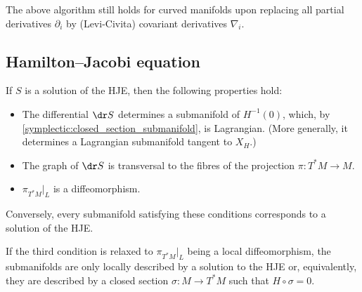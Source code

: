     \begin{remark}
        The above algorithm still holds for curved manifolds upon replacing all partial derivatives $\partial_i$ by (Levi-Civita) covariant derivatives $\nabla_i$.
    \end{remark}


\subsection{Hamilton--Jacobi equation}\label{section:hamilton_jacobi}


    \begin{property}
        If $S$ is a solution of the HJE, then the following properties hold:
        \begin{itemize}
            \item The differential $\dr S$ determines a submanifold of $H^{-1}(0)$, which, by \cref{symplectic:closed_section_submanifold}, is Lagrangian. (More generally, it determines a Lagrangian submanifold tangent to $X_H$.)
            \item The graph of $\dr S$ is transversal to the fibres of the projection $\pi:T^*M\rightarrow M$.
            \item $\pi_{T^*M}|_L$ is a diffeomorphism.
        \end{itemize}
        Conversely, every submanifold satisfying these conditions corresponds to a solution of the HJE.
    \end{property}
    \begin{remark}
        If the third condition is relaxed to $\pi_{T^*M}|_L$ being a local diffeomorphism, the submanifolds are only locally described by a solution to the HJE or, equivalently, they are described by a closed section $\sigma:M\rightarrow T^*M$ such that $H\circ \sigma=0$.
    \end{remark}

